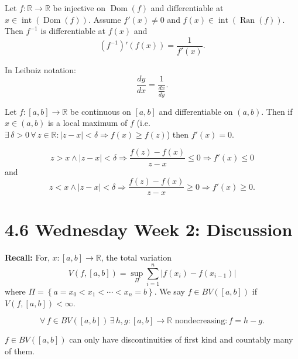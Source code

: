 \documentclass{notes}
\begin{document}
\begin{lem}
  Let $f \colon \mathbb R \to \mathbb R$ be injective on $\operatorname{Dom}(f)$ and differentiable at $x \in \operatorname{int}(\operatorname{Dom}(f))$.
  Assume $f'(x) \neq 0$ and $f(x) \in \operatorname{int}(\operatorname{Ran}(f))$.
  Then $f^{-1}$ is differentiable at $f(x)$ and 
  \[
    (f^{-1})'(f(x)) = \frac{1}{f'(x)}.
  \]
  
  In Leibniz notation: 
  \[
    \frac{dy}{dx} = \frac{1}{\frac{dx}{dy}}.
  \]
\end{lem}

\begin{lem}
  Let $f \colon [a, b] \to \mathbb R$ be continuous on $[a, b]$ and differentiable on $(a, b)$.
  Then if $x \in (a, b)$ is a local maximum of $f$ (i.e. $\exists \, \delta > 0 \, \forall \, z \in \mathbb R: \left | z - x \right | < \delta \Rightarrow f(x) \geq f(z)$) then $f'(x) = 0$.
\end{lem}

\begin{prf}
  \[
    z > x \land \left | z - x \right | < \delta \Rightarrow \frac{f(z) - f(x)}{z - x} \leq 0 \Rightarrow f'(x) \leq 0
  \]
  and 
  \[
    z < x \land \left | z - x \right | < \delta \Rightarrow \frac{f(z) - f(x)}{z - x} \geq 0 \Rightarrow f'(x) \geq 0.
  \]
\end{prf}

\iffalse

\newpage

\section{4.6 Wednesday Week 2: Discussion}

{\boldmath \bfseries Recall:} For, $x \colon [a, b] \to \mathbb R$, the total variation
\[
  V(f, [a, b]) = \sup_{\Pi} \sum_{i = 1}^n \left | f(x_i) -f(x_{i - 1})  \right |
\]
where $\Pi = \left \{ a = x_0 < x_1 < \cdots < x_n = b  \right \}$.
We say $f \in BV([a, b])$ if $V(f, [a, b]) < \infty$.

\begin{thm}
  \[
    \forall \, f \in BV([a, b]) \, \exists \, h, g \colon [a, b] \to \mathbb R \text{ nondecreasing}: f = h - g.
  \]
\end{thm}

\begin{cor}
  $f \in BV([a, b])$ can only have discontinuities of first kind and countably many of them.
\end{cor}
\end{document}
